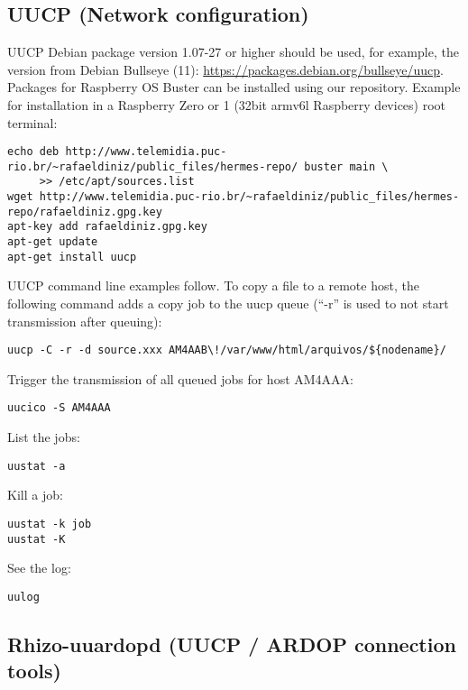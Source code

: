 \documentclass[11pt,a4paper]{article}
\begin{document}
\subsection{UUCP (Network configuration)}

UUCP Debian package version 1.07-27 or higher should be used, for example,
the version from Debian Bullseye (11):
\url{https://packages.debian.org/bullseye/uucp}. Packages for Raspberry OS
Buster can be installed using our repository. Example for installation in a
Raspberry Zero or 1 (32bit armv6l Raspberry devices) root terminal:

\begin{verbatim}
echo deb http://www.telemidia.puc-rio.br/~rafaeldiniz/public_files/hermes-repo/ buster main \
     >> /etc/apt/sources.list
wget http://www.telemidia.puc-rio.br/~rafaeldiniz/public_files/hermes-repo/rafaeldiniz.gpg.key
apt-key add rafaeldiniz.gpg.key
apt-get update
apt-get install uucp
\end{verbatim}


UUCP command line examples follow. To copy a file to a remote host,
the following command adds a copy job to the uucp queue (``-r'' is used to
not start transmission after queuing):
\begin{verbatim}
uucp -C -r -d source.xxx AM4AAB\!/var/www/html/arquivos/${nodename}/
\end{verbatim}

Trigger the transmission of all queued jobs for host
AM4AAA:
\begin{verbatim}
uucico -S AM4AAA
\end{verbatim}

List the jobs:
\begin{verbatim}
uustat -a
\end{verbatim}

Kill a job:
\begin{verbatim}
uustat -k job
uustat -K
\end{verbatim}

See the log:
\begin{verbatim}
uulog
\end{verbatim}


\subsection{Rhizo-uuardopd (UUCP / ARDOP connection tools)}

\end{document}
